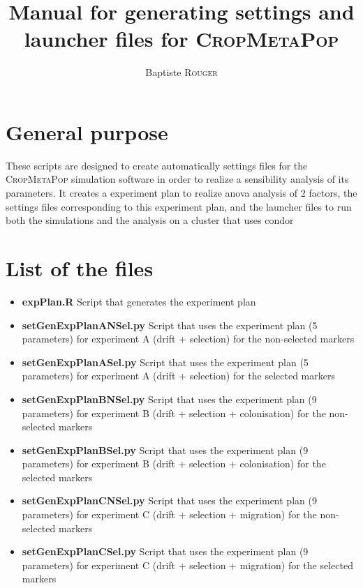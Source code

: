 \documentclass[10pt,a4paper]{article}
\title{Manual for generating settings and launcher files for \textsc{CropMetaPop}}
\author{Baptiste \textsc{Rouger}}
\begin{document}
\maketitle
\section{General purpose}
These scripts are designed to create automatically settings files for the \textsc{CropMetaPop} simulation software in order to realize a sensibility analysis of its parameters.
It creates a experiment plan to realize anova analysis of 2 factors, the settings files corresponding to this experiment plan, and the launcher files to run both the simulations and the analysis on a cluster that uses condor 


\section{List of the files}
\begin{itemize}
        \item \textbf{expPlan.R} Script that generates the experiment plan
        \item \textbf{setGenExpPlanANSel.py} Script that uses the experiment plan (5 parameters) for experiment A (drift + selection) for the non-selected markers
        \item \textbf{setGenExpPlanASel.py} Script that uses the experiment plan (5 parameters) for experiment A (drift + selection) for the selected markers
        \item \textbf{setGenExpPlanBNSel.py} Script that uses the experiment plan (9 parameters) for experiment B (drift + selection + colonisation) for the non-selected markers
        \item \textbf{setGenExpPlanBSel.py} Script that uses the experiment plan (9 parameters) for experiment B (drift + selection + colonisation) for the selected markers
        \item \textbf{setGenExpPlanCNSel.py} Script that uses the experiment plan (9 parameters) for experiment C (drift + selection + migration) for the non-selected markers
        \item \textbf{setGenExpPlanCSel.py} Script that uses the experiment plan (9 parameters) for experiment C (drift + selection + migration) for the selected markers
\end{itemize}
\end{document}
